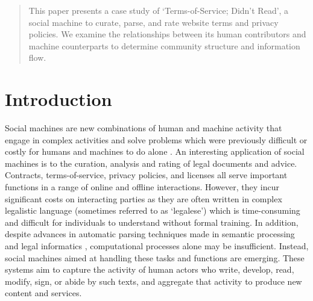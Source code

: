 \documentclass{sig-alternate}
\begin{document}
\maketitle
\begin{abstract}

This paper presents a case study of `Terms-of-Service; Didn't Read', a social machine to curate, parse, and rate website terms and privacy policies. We examine the relationships between its human contributors and machine counterparts to determine community structure and information flow.

\end{abstract}




\section{Introduction}

Social machines are new combinations of human and machine activity that engage in complex activities and solve problems which were previously difficult or costly for humans and machines to do alone \cite{shadbolt:classif}. An interesting application of social machines is to the curation, analysis and rating of legal documents and advice. Contracts, terms-of-service, privacy policies, and licenses all serve important functions in a range of online and offline interactions. However, they incur significant costs on interacting parties as they are often written in complex legalistic language (sometimes referred to as `legalese') which is time-consuming and difficult for individuals to understand without formal training. In addition, despite advances in automatic parsing techniques made in semantic processing and legal informatics \cite{franc:semantic, spinosa:nlp}, computational processes alone may be insufficient. Instead, social machines aimed at handling these tasks and functions are emerging. These systems aim to capture the activity of human actors who write, develop, read, modify, sign, or abide by such texts, and aggregate that activity to produce new content and services.
\end{document}
